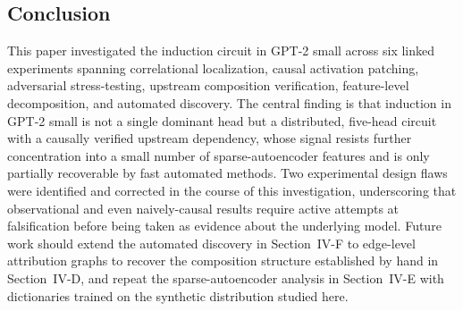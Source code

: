 \documentclass[conference]{IEEEtran}
\begin{document}
\subsection{Conclusion}

This paper investigated the induction circuit in GPT-2 small across six linked experiments spanning correlational localization, causal activation patching, adversarial stress-testing, upstream composition verification, feature-level decomposition, and automated discovery. The central finding is that induction in GPT-2 small is not a single dominant head but a distributed, five-head circuit with a causally verified upstream dependency, whose signal resists further concentration into a small number of sparse-autoencoder features and is only partially recoverable by fast automated methods. Two experimental design flaws were identified and corrected in the course of this investigation, underscoring that observational and even naively-causal results require active attempts at falsification before being taken as evidence about the underlying model. Future work should extend the automated discovery in Section~IV-F to edge-level attribution graphs to recover the composition structure established by hand in Section~IV-D, and repeat the sparse-autoencoder analysis in Section~IV-E with dictionaries trained on the synthetic distribution studied here.
\end{document}
